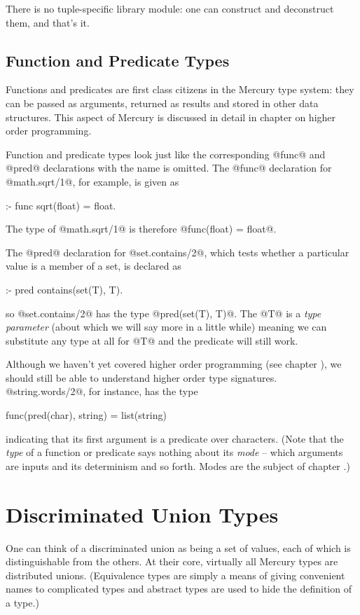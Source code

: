 There is no tuple-specific library module: one can construct and
deconstruct them, and that's it.

\subsection{Function and Predicate Types}

Functions and predicates are first class citizens in the Mercury type
system: they can be passed as arguments, returned as results
and stored in other data structures.  This aspect of Mercury is
discussed in detail in chapter \XXX{} on higher order programming.

Function and predicate types look just like the corresponding @func@ and
@pred@ declarations with the name is omitted.
The @func@ declaration for @math.sqrt/1@, for example, is given as
\begin{myverbatim}
:- func sqrt(float) = float.
\end{myverbatim}
The type of @math.sqrt/1@ is therefore @func(float) = float@.

The @pred@ declaration for @set.contains/2@, which tests whether a
particular value is a member of a set, is declared as
\begin{myverbatim}
:- pred contains(set(T), T).
\end{myverbatim}
so @set.contains/2@ has the type @pred(set(T), T)@.
The @T@ is a \emph{type parameter} (about which we will say more
in a little while) meaning we can substitute any type at all for @T@ and
the predicate will still work.

Although we haven't yet covered higher order programming (see chapter
\XXX{}), we should still be able to understand higher order type
signatures.  @string.words/2@, for instance, has the type
\begin{myverbatim}
    func(pred(char), string) = list(string)
\end{myverbatim}
indicating that its first argument is a predicate over characters.
(Note that the \emph{type} of a function or predicate says nothing about
its \emph{mode} -- which arguments are inputs and its determinism and so
forth.  Modes are the subject of chapter \XXX{}.)

\section{Discriminated Union Types}

One can think of a discriminated union as being a set of values, each of
which is distinguishable from the others.  At their core, virtually all
Mercury types are distributed unions.
(Equivalence types are simply a means of giving convenient names to
complicated types and abstract types are used to hide the
definition of a type.)

